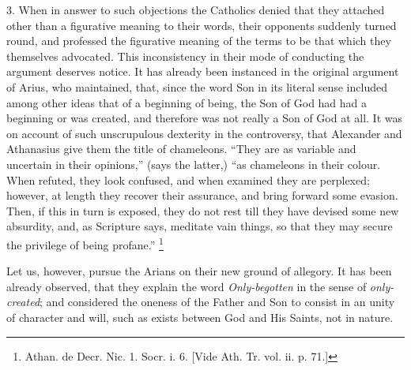 3. When in answer to such objections the Catholics denied that they
attached other than a figurative meaning to their words, their
opponents suddenly turned round, and professed the figurative meaning
of the terms to be that which they themselves advocated. This
inconsistency in their mode of conducting the argument deserves
notice. It has already been instanced in the original argument of
Arius, who maintained, that, since the word Son in its literal sense
included among other ideas that of a beginning of being, the Son of
God had had a beginning or was created, and therefore was not
really a Son of God at all. It was on account of such unscrupulous
dexterity in the controversy, that Alexander and Athanasius give them
the title of chameleons. ``They are as variable and uncertain in
their opinions,'' (says the latter,) ``as chameleons in their
colour. When refuted, they look confused, and when examined they are
perplexed; however, at length they recover their assurance, and bring
forward some evasion. Then, if this in turn is exposed, they do not
rest till they have devised some new absurdity, and, as Scripture
says, meditate vain things, so that they may secure the privilege of
being profane.'' \footnote{Athan. de Decr. Nic. 1. Socr. i. 6. [Vide
Ath. Tr. vol. ii. p. 71.]}

Let us, however, pursue the Arians on their new ground of allegory.
It has been already observed, that they explain the word \emph{Only-begotten}
in the sense of \emph{only-created}; and considered the oneness of the
Father and Son to consist in an unity of character and will, such as
exists between God and His Saints, not in nature.


